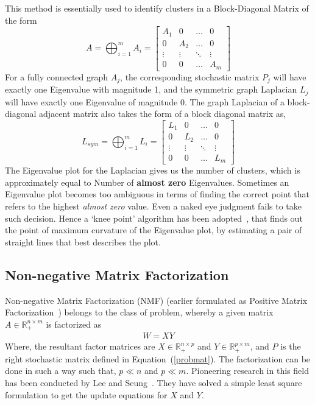 This method is essentially used to identify clusters in a Block-Diagonal Matrix of the form 
\begin{equation}
\label{block}
A = \bigoplus_{i=1}^m A_i = \begin{bmatrix}
A_1 & 0 & \ldots & 0 \\ 0 & A_2  & \ldots & 0 \\ \vdots & \vdots & \ddots & \vdots \\  0 & 0 & \ldots & A_m
\end{bmatrix}
\end{equation}
For a fully connected graph $A_j$, the corresponding stochastic matrix $P_j$ will have exactly one Eigenvalue with magnitude 1, and the symmetric graph Laplacian $L_j$ will have exactly one Eigenvalue of magnitude 0. The graph Laplacian of a block-diagonal adjacent matrix also takes the form of a block diagonal matrix as,
\begin{equation*}
L_{sym} = \bigoplus_{i=1}^m L_i = \begin{bmatrix}
L_1 & 0 & \ldots & 0 \\ 0 & L_2  & \ldots & 0 \\ \vdots & \vdots & \ddots & \vdots \\  0 & 0 & \ldots & L_m
\end{bmatrix}
\end{equation*}
The Eigenvalue plot for the Laplacian gives us the number of clusters, which is approximately equal to Number of \textbf{almost zero} Eigenvalues. Sometimes an Eigenvalue plot becomes too ambiguous in terms of finding the correct point that refers to the highest \textit{almost zero} value. Even a naked eye judgment fails to take such decision. Hence a `knee point' algorithm has been adopted~\cite{salvador2004determining}, that finds out the point of maximum curvature of the Eigenvalue plot, by estimating a pair of straight lines that best describes the plot. 


\subsection{Non-negative Matrix Factorization}

Non-negative Matrix Factorization (NMF) (earlier formulated as Positive Matrix Factorization~\cite{paatero1994positive}) belongs to the class of problem, whereby a given matrix $A \in \mathbb{R}^{n \times m}_+$ is factorized as
\begin{align}
W = XY
\end{align}  
Where, the resultant factor matrices are $X \in \mathbb{R}^{n \times p}_+$ and $Y \in \mathbb{R}^{p \times m}_+$, and $P$ is the right stochastic matrix defined in Equation~(\ref{probmat}). The factorization can be done in such a way such that, $p \ll n $ and $p \ll m$. Pioneering research in this field has been conducted by Lee and Seung~\cite{lee1999learning}. They have solved a simple least square formulation to get the update equations for $X$ and $Y$. 

